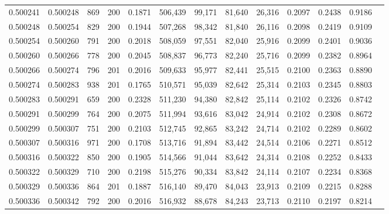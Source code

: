 \begin{tabular}{rrrrrrrrrrrrr}
0.500241 & 0.500248 &   869 & 200 &                                     0.1871 & 506,439 &  99,171 &  81,640 &  26,316 & 0.2097 & 0.2438 & 0.9186 \\
0.500248 & 0.500254 &   829 & 200 &                                     0.1944 & 507,268 &  98,342 &  81,840 &  26,116 & 0.2098 & 0.2419 & 0.9109 \\
0.500254 & 0.500260 &   791 & 200 &                                     0.2018 & 508,059 &  97,551 &  82,040 &  25,916 & 0.2099 & 0.2401 & 0.9036 \\
0.500260 & 0.500266 &   778 & 200 &                                     0.2045 & 508,837 &  96,773 &  82,240 &  25,716 & 0.2099 & 0.2382 & 0.8964 \\
0.500266 & 0.500274 &   796 & 201 &                                     0.2016 & 509,633 &  95,977 &  82,441 &  25,515 & 0.2100 & 0.2363 & 0.8890 \\
0.500274 & 0.500283 &   938 & 201 &                                     0.1765 & 510,571 &  95,039 &  82,642 &  25,314 & 0.2103 & 0.2345 & 0.8803 \\
0.500283 & 0.500291 &   659 & 200 &                                     0.2328 & 511,230 &  94,380 &  82,842 &  25,114 & 0.2102 & 0.2326 & 0.8742 \\
0.500291 & 0.500299 &   764 & 200 &                                     0.2075 & 511,994 &  93,616 &  83,042 &  24,914 & 0.2102 & 0.2308 & 0.8672 \\
0.500299 & 0.500307 &   751 & 200 &                                     0.2103 & 512,745 &  92,865 &  83,242 &  24,714 & 0.2102 & 0.2289 & 0.8602 \\
0.500307 & 0.500316 &   971 & 200 &                                     0.1708 & 513,716 &  91,894 &  83,442 &  24,514 & 0.2106 & 0.2271 & 0.8512 \\
0.500316 & 0.500322 &   850 & 200 &                                     0.1905 & 514,566 &  91,044 &  83,642 &  24,314 & 0.2108 & 0.2252 & 0.8433 \\
0.500322 & 0.500329 &   710 & 200 &                                     0.2198 & 515,276 &  90,334 &  83,842 &  24,114 & 0.2107 & 0.2234 & 0.8368 \\
0.500329 & 0.500336 &   864 & 201 &                                     0.1887 & 516,140 &  89,470 &  84,043 &  23,913 & 0.2109 & 0.2215 & 0.8288 \\
0.500336 & 0.500342 &   792 & 200 &                                     0.2016 & 516,932 &  88,678 &  84,243 &  23,713 & 0.2110 & 0.2197 & 0.8214 \\

\end{tabular}
